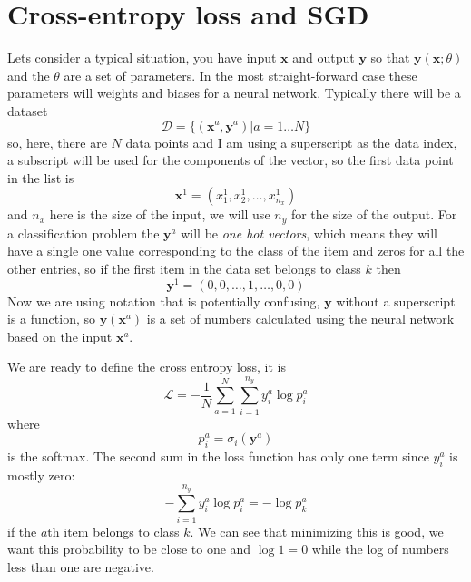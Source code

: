 \documentclass[12pt]{article}
\begin{document}
\section*{Cross-entropy loss and SGD}

Lets consider a typical situation, you have input $\mathbf{x}$ and
output $\mathbf{y}$ so that $\mathbf{y}(\textbf{x};\theta)$ and the
$\theta$ are a set of parameters. In the most straight-forward case
these parameters will weights and biases for a neural
network. Typically there will be a dataset
\begin{equation}
  \mathcal{D}=\{(\mathbf{x}^a,\mathbf{y}^a)|a=1\ldots N\}
\end{equation}
so, here, there are $N$ data points and I am using a superscript as
the data index, a subscript will be used for the components of the
vector, so the first data point in the list is
\begin{equation}
  \mathbf{x}^1=(x^1_1,x^1_2,\ldots,x^1_{n_x})
\end{equation}
and $n_x$ here is the size of the input, we will use $n_y$ for the
size of the output. For a classification problem the $\mathbf{y}^a$
will be \textsl{one hot vectors}, which means they will have a single
one value corresponding to the class of the item and zeros for all the
other entries, so if the first item in the data set belongs to class
$k$ then
\begin{equation}
  \mathbf{y}^1=(0,0,\ldots,1,\ldots,0,0)
\end{equation}
Now we are using notation that is potentially confusing, $\mathbf{y}$
without a superscript is a function, so $\mathbf{y}(\mathbf{x}^a)$ is
a set of numbers calculated using the neural network based on the
input $\mathbf{x}^a$.

We are ready to define the cross entropy loss, it is
\begin{equation}
  \mathcal{L}=-\frac{1}{N}\sum_{a=1}^N \sum_{i=1}^{n_y}y_i^a \log{p_i^a}
\end{equation}
where
\begin{equation}
  p_i^a=\sigma_i(\mathbf{y}^a)
\end{equation}
is the softmax. The second sum in the loss function has only one term
since $y_i^a$ is mostly zero:
\begin{equation}
  -\sum_{i=1}^{n_y}y_i^a \log{p_i^a}=-\log{p_k^a}
\end{equation}
if the $a$th item belongs to class $k$. We can see that minimizing
this is good, we want this probability to be close to one and
$\log{1}=0$ while the log of numbers less than one are negative. 
\end{document}
